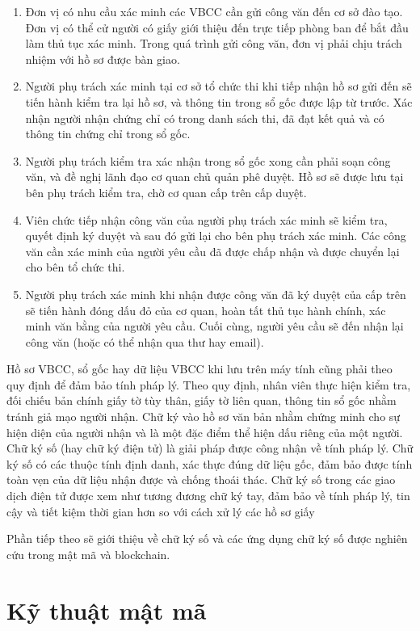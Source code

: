 \begin{enumerate}
\item Đơn vị có nhu cầu xác minh các VBCC cần gửi công văn đến cơ sở đào tạo. Đơn vị có thể cử người có giấy giới thiệu đến trực tiếp phòng ban để bắt đầu làm thủ tục xác minh. Trong quá trình gửi công văn, đơn vị phải chịu trách nhiệm với hồ sơ được bàn giao.
\item Người phụ trách xác minh tại cơ sở tổ chức thi khi tiếp nhận hồ sơ gửi đến sẽ tiến hành kiểm tra lại hồ sơ, và thông tin trong sổ gốc được lập từ trước. Xác nhận người nhận chứng chỉ có trong danh sách thi, đã đạt kết quả và có thông tin chứng chỉ trong sổ gốc.
\item Người phụ trách kiểm tra xác nhận trong sổ gốc xong cần phải soạn công văn, và đề nghị lãnh đạo cơ quan chủ quản phê duyệt. Hồ sơ sẽ được lưu tại bên phụ trách kiểm tra, chờ cơ quan cấp trên cấp duyệt.
\item Viên chức tiếp nhận công văn của người phụ trách xác minh sẽ kiểm tra, quyết định ký duyệt và sau đó gửi lại cho bên phụ trách xác minh. Các công văn cần xác minh của người yêu cầu đã được chấp nhận và được chuyển lại cho bên tổ chức thi.
\item Người phụ trách xác minh khi nhận được công văn đã ký duyệt của cấp trên sẽ tiến hành đóng dấu đỏ của cơ quan, hoàn tất thủ tục hành chính, xác minh văn bằng của người yêu cầu. Cuối cùng, người yêu cầu sẽ đến nhận lại công văn (hoặc có thể nhận qua thư hay email).
\end{enumerate}

Hồ sơ VBCC, sổ gốc hay dữ liệu VBCC khi lưu trên máy tính cũng phải theo quy định để đảm bảo tính pháp lý.
Theo quy định, nhân viên thực hiện kiểm tra, đối chiếu bản chính giấy tờ tùy thân, giấy tờ liên quan, thông tin sổ gốc nhằm tránh giả mạo người nhận.
Chữ ký vào hồ sơ văn bản nhằm chứng minh cho sự hiện diện của người nhận và là một đặc điểm thể hiện dấu riêng của một người.
Chữ ký số (hay chữ ký điện tử) là giải pháp được công nhận về tính pháp lý. Chữ ký số có các thuộc tính định danh, xác thực đúng dữ liệu gốc, đảm bảo được tính toàn vẹn của dữ liệu nhận được và chống thoái thác. Chữ ký số trong các giao dịch điện tử được xem như tương đương chữ ký tay, đảm bảo về tính pháp lý, tin cậy và tiết kiệm thời gian hơn so với cách xử lý các hồ sơ giấy

Phần tiếp theo sẽ giới thiệu về chữ ký số và các ứng dụng chữ ký số được nghiên cứu trong mật mã và blockchain.

\section{Kỹ thuật mật mã}

